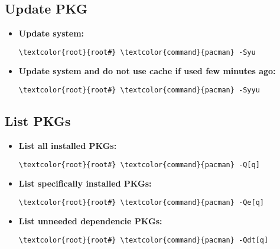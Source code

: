 \documentclass[10pt, a4paper, onecolumn, openany]{book} %
\begin{document}
\subsection{Update PKG}
\begin{itemize}
    \item \textbf{Update system:}
\begin{Verbatim}[commandchars=\\\{\}]
\textcolor{root}{root#} \textcolor{command}{pacman} -Syu
\end{Verbatim}
    \item \textbf{Update system and do not use cache if used few minutes ago:}
\begin{Verbatim}[commandchars=\\\{\}]
\textcolor{root}{root#} \textcolor{command}{pacman} -Syyu
\end{Verbatim} 
\end{itemize}
\subsection{List PKGs}
\begin{itemize}
    \item \textbf{List all installed PKGs:}
\begin{Verbatim}[commandchars=\\\{\}]
\textcolor{root}{root#} \textcolor{command}{pacman} -Q[q]
\end{Verbatim}
    \item \textbf{List specifically installed PKGs:}
\begin{Verbatim}[commandchars=\\\{\}]
\textcolor{root}{root#} \textcolor{command}{pacman} -Qe[q]
\end{Verbatim}
    \item \textbf{List unneeded dependencie PKGs:}
\begin{Verbatim}[commandchars=\\\{\}]
\textcolor{root}{root#} \textcolor{command}{pacman} -Qdt[q]
\end{Verbatim}
\end{itemize}
\end{document}
